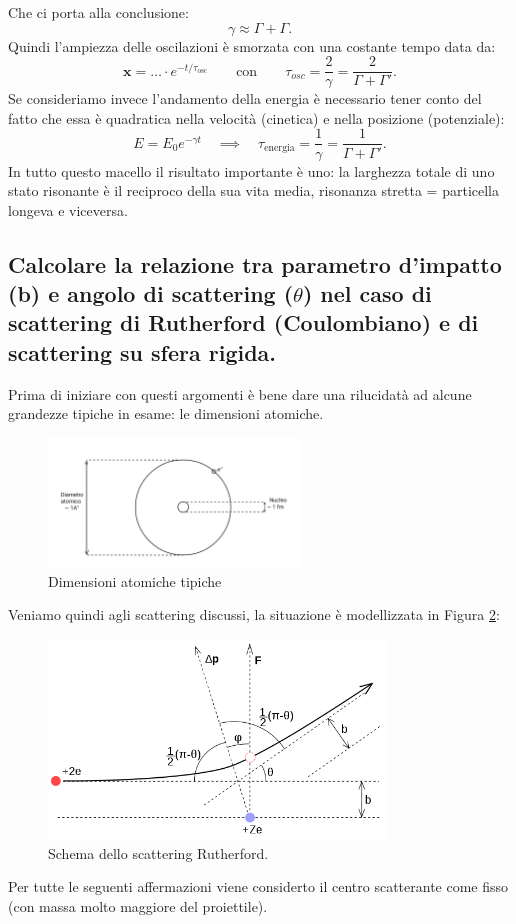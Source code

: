 Che ci porta alla conclusione:
\[
\gamma \approx \Gamma + \Gamma 
.\]
Quindi l'ampiezza delle oscilazioni è smorzata con una costante tempo data da:
\[
	\boldsymbol{x} = \ldots \cdot e^{- t /\tau_{\text{osc}}} \quad \quad \text{con} \quad \quad
\tau_{osc} = \frac{2}{\gamma} = \frac{2}{\Gamma + \Gamma'}
.\]
Se consideriamo invece l'andamento della energia è necessario tener conto del fatto che essa è quadratica nella velocità (cinetica) e nella posizione (potenziale): 
\[
E = E_0 e^{- \gamma t} \quad \implies \quad \tau_{\text{energia}} = \frac{1}{\gamma} = \frac{1}{\Gamma + \Gamma'}
.\]
In tutto questo macello il risultato importante è uno: la larghezza totale di uno stato risonante è il reciproco della sua vita media, risonanza stretta = particella longeva e viceversa.

\subsection[]{Calcolare la relazione tra parametro d'impatto (b) e angolo di scattering ($\theta$) nel caso di scattering di Rutherford (Coulombiano) e di scattering su sfera rigida.} 
Prima di iniziare con questi argomenti è bene dare una rilucidatà ad alcune grandezze tipiche in esame: le dimensioni atomiche.
\begin{figure}[H]
	\centering
	\includegraphics[width=0.6\textwidth]{immagini/dim-atomo.png}
	\caption{Dimensioni atomiche tipiche}
	\label{fig:atomo}
\end{figure}
Veniamo quindi agli scattering discussi, la situazione è modellizzata in Figura \ref{fig:rutherford}:
\begin{figure}[H]
	\centering
	\includegraphics[width=0.8\textwidth]{immagini/rutherford.png}
	\caption{Schema dello scattering Rutherford.}
	\label{fig:rutherford}
\end{figure}
Per tutte le seguenti affermazioni viene considerto il centro scatterante come fisso (con massa molto maggiore del proiettile).
